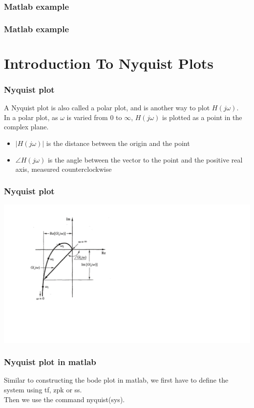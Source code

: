 \begin{frame}
\frametitle{Matlab example}

\end{frame}

\begin{frame}
\frametitle{Matlab example}

\end{frame}


\section{Introduction To Nyquist Plots}
\begin{frame}
\frametitle{Nyquist plot}
A Nyquist plot is also called a polar plot, and is another way to plot $H(j\omega)$.\\
In a polar plot, as $\omega$ is varied from 0 to $\infty$, $H(j\omega)$ is plotted as a point in the complex plane.
\begin{itemize}
\item $|H(j\omega)|$ is the distance between the origin and the point
\item $\angle H(j\omega)$ is the angle between the vector to the point and the positive real axis, measured counterclockwise 
\end{itemize}

\end{frame}

\begin{frame}
\frametitle{Nyquist plot}


\includegraphics[scale=0.5]{NyquistPlot}



\end{frame}

\begin{frame}
\frametitle{Nyquist plot in matlab}
Similar to constructing the bode plot in matlab, we first have to define the system using tf, zpk or ss.\\
Then we use the command nyquist(sys).


\end{frame}

